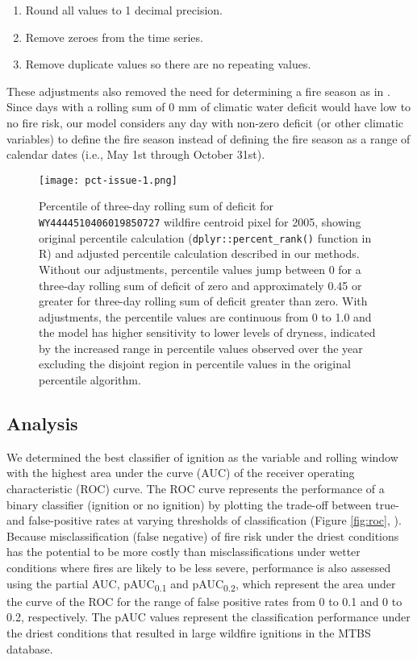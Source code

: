 \documentclass[11p]{article}
\newcommand{\pauc}[1]{pAUC\textsubscript{#1}}
\begin{document}
\begin{enumerate}
\item Round all values to 1 decimal precision.
\item Remove zeroes from the time series.
\item Remove duplicate values so there are no repeating values.
\end{enumerate}
   
These adjustments %
also removed the need for determining a fire season as in \citet{thomaWaterBalanceIndicator2020}. Since days with a rolling sum of 0 mm of climatic water deficit would have low to no fire risk, our model considers any day with non-zero deficit (or other climatic variables) to define the fire season instead of defining the fire season as a range of calendar dates (i.e., May 1st through October 31st).

\begin{figure}[htbp]
  \centering
  \texttt{[image: pct-issue-1.png]}
  \caption{Percentile of three-day rolling sum of deficit for \texttt{WY4444510406019850727} wildfire centroid pixel for 2005, showing original percentile calculation (\texttt{dplyr::percent\_rank()} function in R) and adjusted percentile calculation described in our methods. Without our adjustments, percentile values jump between 0 for a three-day rolling sum of deficit of zero and approximately 0.45 or greater for three-day rolling sum of deficit greater than zero. With adjustments, the percentile values are continuous from 0 to 1.0 and the model has higher sensitivity to lower levels of dryness, indicated by the increased range in percentile values observed over the year excluding the disjoint region in percentile values in the original percentile algorithm.}
  \label{fig:pct-issue}
\end{figure}

\subsection{Analysis}

We determined the best classifier of ignition as the variable and rolling window with the highest area under the curve (AUC) of the receiver operating characteristic (ROC) curve. The ROC curve represents the performance of a binary classifier (ignition or no ignition) by plotting the trade-off between true- and false-positive rates at varying thresholds of classification (Figure \ref{fig:roc}, \citet{pontiusRecommendationsUsingRelative2014}). Because misclassification (false negative) of fire risk under the driest conditions has the potential to be more costly than misclassifications under wetter conditions where fires are likely to be less severe, performance is also assessed using the partial AUC, \pauc{0.1} and \pauc{0.2}, which represent the area under the curve of the ROC for the range of false positive rates from 0 to 0.1 and 0 to 0.2, respectively. The pAUC values represent the classification performance under the driest conditions that resulted in large wildfire ignitions in the MTBS database.
\end{document}
